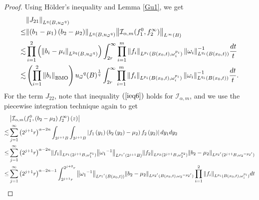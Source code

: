 \documentclass[11pt, twoside, leqno]{article}
\begin{document}
\begin{proof}[Proof]
	Using H\"older's inequality and Lemma \ref{Gu1}, we get 
	\begin{align}\label{eq3.8}
	&{\left\| {{J_{21}}} \right\|_{{L^q}\left( {B,{{u_{\vec \omega }}^q}} \right)}}\notag\\
	\le& {\left\| {\left( {{b_1} - {\mu _1}} \right)\left( {{b_2} - {\mu _2}} \right)} \right\|_{{L^q}\left( {B,{{u_{\vec \omega }}^q}} \right)}}{\left\| {{\mathcal I}_{\alpha,m}(f_1^0,f_2^\infty )} \right\|_{{L^\infty }\left( B \right)}}\notag\\
	\lesssim& \prod\limits_{i = 1}^2 {\left( {{{\left\| {{b_i} - {\mu _i}} \right\|}_{{L^{2q}}(B,{{u_{\vec \omega }}^q})}}} \right)} \int_{2r}^\infty  {\prod\limits_{i = 1}^m {{{\left\| {{f_i}} \right\|}_{{L^{{p_i}}}(B({x_0},t), \omega _i^{{p_i}})}}\left\| {{\omega _i}} \right\|_{{L^{{q_i}}}(B({x_0},t))}^{ - 1}} \frac{{dt}}{t}}\notag\\ 
	\lesssim&\left( {\prod\limits_{i = 1}^2 {{{\left\| {{b_i}} \right\|}_{\rm BMO}}} } \right){{{u_{\vec \omega }}^q}}{\left( B \right)^{\frac{1}{q}}} \int_{2r}^\infty  {\prod\limits_{i = 1}^m {{{\left\| {{f_i}} \right\|}_{{L^{{p_i}}}(B({x_0},t),\omega _i^{{p_i}})}}\left\| {{\omega _i}} \right\|_{{L^{{q_i}}}(B({x_0},t))}^{ - 1}} \frac{{dt}}{t}}.
	\end{align}
	For the term ${J_{22}}$, note that inequality $(\ref{ieq6})$ holds for $\mathcal{I}_{\alpha,m}$, and we use the piecewise integration technique again to get
	\begin{align}\label{eq3.9}
	&\left| {{{\mathcal I}_{\alpha,m}}(f_1^0,\left( {{b_2} - {\mu _2}} \right)f_2^\infty )\left( z \right)} \right|\notag\\
	\lesssim&\sum\limits_{j = 1}^\infty  {{{\left( {{2^{j + 1}}r} \right)}^{\alpha  - 2n}}\int_{{2^{j + 1}}B} {\int_{{2^{j + 1}}B} {\left| {{f_1}\left( {{y_1}} \right)\left( {{b_2}\left( {{y_2}} \right) - {\mu _2}} \right){f_2}\left( {{y_2}} \right)} \right|d{y_1}} d{y_2}} }\notag\\ 
	\le&\sum\limits_{j = 1}^\infty  {{{\left( {{2^{j + 1}}r} \right)}^{\alpha  - 2n}}{{\left\| {{f_1}} \right\|}_{{L^{{p_1}}}({2^{j + 1}}B,\omega _1^{{p_1}})}}{{\left\| {{\omega _1}^{ - 1}} \right\|}_{{L^{{p_1}^\prime }}({2^{j + 1}}B)}}{{\left\| {{f_2}} \right\|}_{{L^{{p_2}}}({2^{j + 1}}B,\omega _2^{{p_2}})}}{{\left\| {{b_2} - {\mu _2}} \right\|}_{{L^{{p_2}^\prime }}({2^{j + 1}}B,{\omega _2}^{ - {p_2}^\prime })}}}\notag\\
	\le&\sum\limits_{j = 1}^\infty  {{{\left( {{2^{j + 1}}r} \right)}^{\alpha  - 2n - 1}}\int_{{2^{j + 1}}r}^{{2^{j + 2}}r} {{{\left\| {{\omega _1}^{ - 1}} \right\|}_{{L^{{p_1}^\prime }}(B\left( {{x_0},t} \right))}}{{\left\| {{b_2} - {\mu _2}} \right\|}_{{L^{{p_2}^\prime }}(B\left( {{x_0},t} \right),{\omega _2}^{ - {p_2}^\prime })}}\prod\limits_{i = 1}^2 {{{\left\| {{f_i}} \right\|}_{{L^{{p_i}}}(B\left( {{x_0},t} \right),\omega _i^{{p_i}})}}} dt} }\notag\\

\end{align}
\end{proof}
\end{document}
